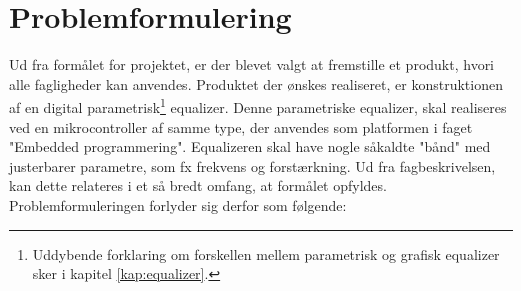 \section{Problemformulering}
%
%


%
Ud fra formålet for projektet, er der blevet valgt at fremstille et produkt, hvori alle fagligheder kan anvendes. 
Produktet der ønskes realiseret, er konstruktionen af en digital parametrisk\footnote{Uddybende forklaring om forskellen mellem parametrisk og grafisk equalizer sker i kapitel \ref{kap:equalizer}.} equalizer. 
Denne parametriske equalizer, skal realiseres ved en mikrocontroller af samme type, der anvendes som platformen i faget "Embedded programmering".
Equalizeren skal have nogle såkaldte "bånd" med justerbarer parametre, som fx frekvens og forstærkning. 
Ud fra fagbeskrivelsen, kan dette relateres i et så bredt omfang, at formålet opfyldes. 
Problemformuleringen forlyder sig derfor som følgende: \\

